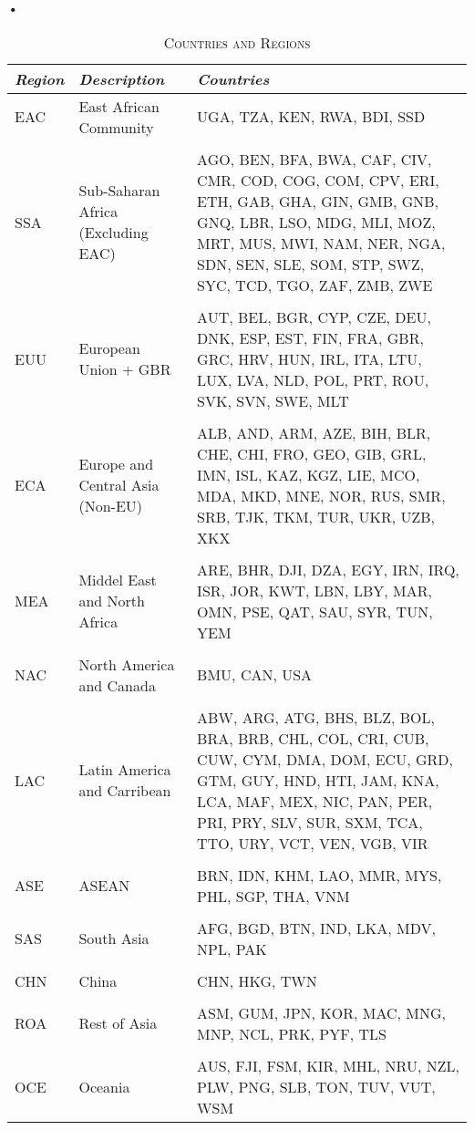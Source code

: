\textbf{\textbf{•}}\documentclass[a4paper]{article}
\begin{document}
\begin{table}[h!]
\centering
\caption{\textsc{Countries and Regions}}

\label{tab:ctry}
\vspace{2mm}
\begin{tabular}{llp{6cm}} \toprule
\textit{Region} & \textit{Description} & \textit{Countries} \\ \midrule
EAC & East African Community & UGA, TZA, KEN, RWA, BDI, SSD \\ \\
SSA & Sub-Saharan Africa (Excluding EAC) & AGO, BEN, BFA, BWA, CAF, CIV, CMR, COD, COG, COM, CPV, ERI, ETH, GAB, GHA, GIN, GMB, GNB, GNQ, LBR, LSO, MDG, MLI, MOZ, MRT, MUS, MWI, NAM, NER, NGA, SDN, SEN, SLE, SOM, STP, SWZ, SYC, TCD, TGO, ZAF, ZMB, ZWE \\ \\
EUU & European Union + GBR & AUT, BEL, BGR, CYP, CZE, DEU, DNK, ESP, EST, FIN, FRA, GBR, GRC, HRV, HUN, IRL, ITA, LTU, LUX, LVA, NLD, POL, PRT, ROU, SVK, SVN, SWE, MLT \\ \\
ECA & Europe and Central Asia (Non-EU) & ALB, AND, ARM, AZE, BIH, BLR, CHE, CHI, FRO, GEO, GIB, GRL, IMN, ISL, KAZ, KGZ, LIE, MCO, MDA, MKD, MNE, NOR, RUS, SMR, SRB, TJK, TKM, TUR, UKR, UZB, XKX \\ \\
MEA & Middel East and North Africa & ARE, BHR, DJI, DZA, EGY, IRN, IRQ, ISR, JOR, KWT, LBN, LBY, MAR, OMN, PSE, QAT, SAU, SYR, TUN, YEM \\ \\
NAC & North America and Canada & BMU, CAN, USA \\ \\
LAC & Latin America and Carribean & ABW, ARG, ATG, BHS, BLZ, BOL, BRA, BRB, CHL, COL, CRI, CUB, CUW, CYM, DMA, DOM, ECU, GRD, GTM, GUY, HND, HTI, JAM, KNA, LCA, MAF, MEX, NIC, PAN, PER, PRI, PRY, SLV, SUR, SXM, TCA, TTO, URY, VCT, VEN, VGB, VIR \\ \\
ASE & ASEAN & BRN, IDN, KHM, LAO, MMR, MYS, PHL, SGP, THA, VNM \\ \\
SAS & South Asia & AFG, BGD, BTN, IND, LKA, MDV, NPL, PAK \\ \\
CHN & China & CHN, HKG, TWN \\ \\
ROA & Rest of Asia & ASM, GUM, JPN, KOR, MAC, MNG, MNP, NCL, PRK, PYF, TLS \\ \\
OCE & Oceania & AUS, FJI, FSM, KIR, MHL, NRU, NZL, PLW, PNG, SLB, TON, TUV, VUT, WSM
 \\ \bottomrule
\end{tabular}
\end{table}
\FloatBarrier
\end{document}
